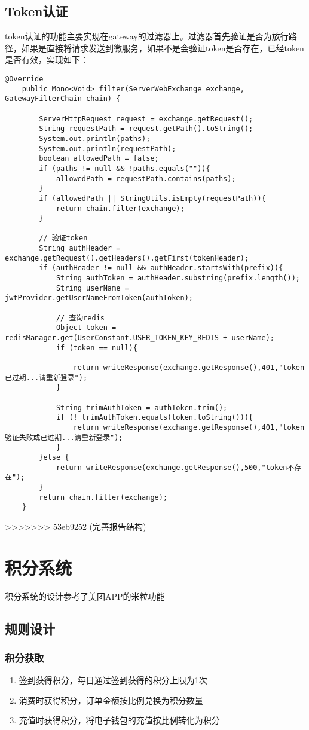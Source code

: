 \subsection{Token认证}
token认证的功能主要实现在gateway的过滤器上。过滤器首先验证是否为放行路径，如果是直接将请求发送到微服务，如果不是会验证token是否存在，已经token是否有效，实现如下：
\begin{lstlisting}[basicstyle=\footnotesize]
	@Override
	public Mono<Void> filter(ServerWebExchange exchange, GatewayFilterChain chain) {
		
		ServerHttpRequest request = exchange.getRequest();
		String requestPath = request.getPath().toString();
		System.out.println(paths);
		System.out.println(requestPath);
		boolean allowedPath = false;
		if (paths != null && !paths.equals("")){
			allowedPath = requestPath.contains(paths);
		}
		if (allowedPath || StringUtils.isEmpty(requestPath)){
			return chain.filter(exchange);
		}
		
		// 验证token
		String authHeader = exchange.getRequest().getHeaders().getFirst(tokenHeader);
		if (authHeader != null && authHeader.startsWith(prefix)){
			String authToken = authHeader.substring(prefix.length());
			String userName = jwtProvider.getUserNameFromToken(authToken);
			
			// 查询redis
			Object token = redisManager.get(UserConstant.USER_TOKEN_KEY_REDIS + userName);
			if (token == null){
				
				return writeResponse(exchange.getResponse(),401,"token已过期...请重新登录");
			}
			
			String trimAuthToken = authToken.trim();
			if (! trimAuthToken.equals(token.toString())){
				return writeResponse(exchange.getResponse(),401,"token验证失败或已过期...请重新登录");
			}
		}else {
			return writeResponse(exchange.getResponse(),500,"token不存在");
		}
		return chain.filter(exchange);
	}
\end{lstlisting}
>>>>>>> 53eb9252 (完善报告结构)

\section{积分系统}
积分系统的设计参考了美团APP的米粒功能
\subsection{规则设计}
\subsubsection{积分获取}
\begin{enumerate}
	\item 签到获得积分，每日通过签到获得的积分上限为1次
	\item 消费时获得积分，订单金额按比例兑换为积分数量
	\item 充值时获得积分，将电子钱包的充值按比例转化为积分
\end{enumerate}
